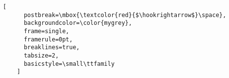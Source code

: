 
\added[id=4th]{
}

\deleted[id=4th]{
}

\replaced[id=4th]{}{
}


  \par\bigskip
  \centering
  \begin{minipage}{0.9\columnwidth}
    \caption[]{
    }
    \label{}
  \end{minipage}
  
\FloatBarrier

    \centering
    \begin{minipage}{0.9\columnwidth}
      \begin{lstlisting}[frame=lines,breaklines=true,basicstyle=\small\ttfamily]
      \end{lstlisting}
    \end{minipage}


\begin{minipage}{0.9\columnwidth}
  \begin{lstlisting}[
      postbreak=\mbox{\textcolor{red}{$\hookrightarrow$}\space},
      backgroundcolor=\color{mygrey},
      frame=single,
      framerule=0pt,
      breaklines=true,
      tabsize=2,
      basicstyle=\small\ttfamily
    ]

  \end{lstlisting}
\end{minipage}




\added[id=3rd]{
}

\deleted[id=3rd]{
}

\replaced[id=3rd]{}{}

